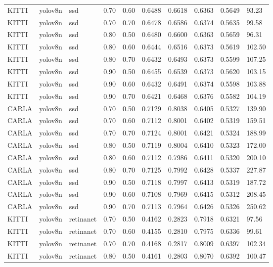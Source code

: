 \begin{tabular}{llllllllll}
KITTI & yolov8n & ssd & 0.70 & 0.60 & 0.6488 & 0.6618 & 0.6363 & 0.5649 & 93.23 \\
KITTI & yolov8n & ssd & 0.70 & 0.70 & 0.6478 & 0.6586 & 0.6374 & 0.5635 & 99.58 \\
KITTI & yolov8n & ssd & 0.80 & 0.50 & 0.6480 & 0.6600 & 0.6363 & 0.5659 & 96.31 \\
KITTI & yolov8n & ssd & 0.80 & 0.60 & 0.6444 & 0.6516 & 0.6373 & 0.5619 & 102.50 \\
KITTI & yolov8n & ssd & 0.80 & 0.70 & 0.6432 & 0.6493 & 0.6373 & 0.5599 & 107.25 \\
KITTI & yolov8n & ssd & 0.90 & 0.50 & 0.6455 & 0.6539 & 0.6373 & 0.5620 & 103.15 \\
KITTI & yolov8n & ssd & 0.90 & 0.60 & 0.6432 & 0.6491 & 0.6374 & 0.5598 & 103.88 \\
KITTI & yolov8n & ssd & 0.90 & 0.70 & 0.6421 & 0.6468 & 0.6376 & 0.5582 & 104.19 \\
CARLA & yolov8n & ssd & 0.70 & 0.50 & 0.7129 & 0.8038 & 0.6405 & 0.5327 & 139.90 \\
CARLA & yolov8n & ssd & 0.70 & 0.60 & 0.7112 & 0.8001 & 0.6402 & 0.5319 & 159.51 \\
CARLA & yolov8n & ssd & 0.70 & 0.70 & 0.7124 & 0.8001 & 0.6421 & 0.5324 & 188.99 \\
CARLA & yolov8n & ssd & 0.80 & 0.50 & 0.7119 & 0.8004 & 0.6410 & 0.5323 & 172.00 \\
CARLA & yolov8n & ssd & 0.80 & 0.60 & 0.7112 & 0.7986 & 0.6411 & 0.5320 & 200.10 \\
CARLA & yolov8n & ssd & 0.80 & 0.70 & 0.7125 & 0.7992 & 0.6428 & 0.5337 & 227.87 \\
CARLA & yolov8n & ssd & 0.90 & 0.50 & 0.7118 & 0.7997 & 0.6413 & 0.5319 & 187.72 \\
CARLA & yolov8n & ssd & 0.90 & 0.60 & 0.7108 & 0.7969 & 0.6415 & 0.5312 & 208.45 \\
CARLA & yolov8n & ssd & 0.90 & 0.70 & 0.7113 & 0.7964 & 0.6426 & 0.5326 & 250.62 \\
KITTI & yolov8n & retinanet & 0.70 & 0.50 & 0.4162 & 0.2823 & 0.7918 & 0.6321 & 97.56 \\
KITTI & yolov8n & retinanet & 0.70 & 0.60 & 0.4155 & 0.2810 & 0.7975 & 0.6336 & 99.61 \\
KITTI & yolov8n & retinanet & 0.70 & 0.70 & 0.4168 & 0.2817 & 0.8009 & 0.6397 & 102.34 \\
KITTI & yolov8n & retinanet & 0.80 & 0.50 & 0.4161 & 0.2803 & 0.8070 & 0.6392 & 100.47 \\

\end{tabular}
